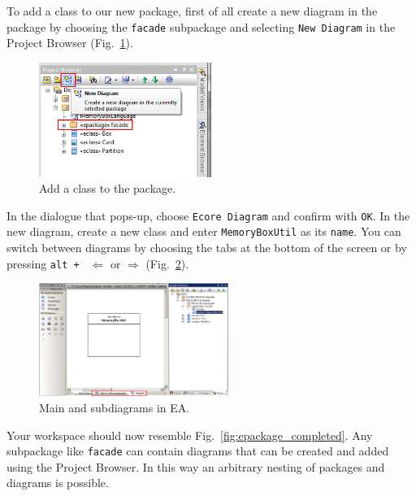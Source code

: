 To add a class to our new package, first of all create a new diagram in
the package by choosing the \texttt{facade} subpackage and selecting \texttt{New
Diagram} in the Project Browser (Fig.~\ref{fig:epackage_newelement}).

\begin{figure}[htbp]
	\centering
  \includegraphics[width=0.5\textwidth]{pics/memBoxBilder/memBox19}
	\caption{Add a class to the package.}
	\label{fig:epackage_newelement}
\end{figure}

In the dialogue that pops-up, choose \texttt{Ecore Diagram} and confirm with
\texttt{OK}.
In the new diagram, create a new class and enter \texttt{MemoryBoxUtil} as its
\texttt{name}.  You can switch between diagrams by choosing the tabs at the
bottom of the screen or by pressing \texttt{alt + } $\Leftarrow$ or
$\Rightarrow$ (Fig.~\ref{fig:epackage_newdiagram}). 

\begin{figure}[htbp] 
	\centering
  \includegraphics[width=0.55\textwidth]{pics/memBoxBilder/memBox20}
	\caption{Main and subdiagrams in EA.}
	\label{fig:epackage_newdiagram}
\end{figure}
\clearpage 

Your workspace should now resemble Fig.~\ref{fig:epackage_completed}.
Any subpackage like \texttt{facade} can contain diagrams that can be
created and added using the Project Browser. 
In this way an arbitrary nesting of packages and diagrams is possible.

